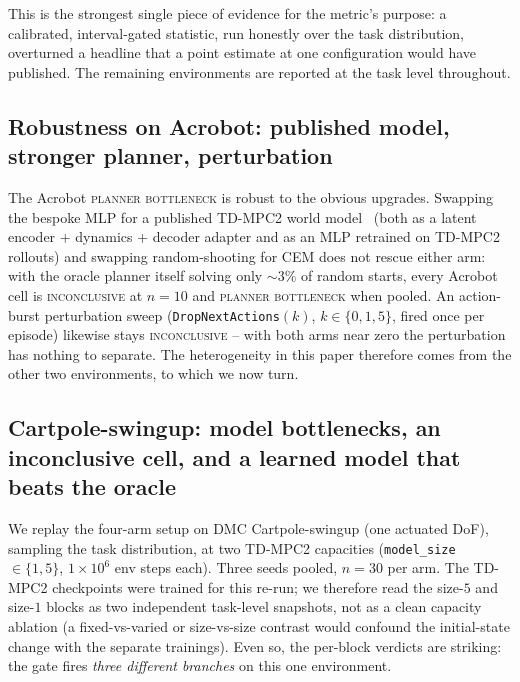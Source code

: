 \documentclass[10pt,letterpaper]{article}
\begin{document}
This is the strongest single piece of evidence for the metric's purpose: a calibrated, interval-gated statistic, run honestly over the task distribution, overturned a headline that a point estimate at one configuration would have published. The remaining environments are reported at the task level throughout.

\subsection{Robustness on Acrobot: published model, stronger planner, perturbation}
\label{sec:robustness}

The Acrobot \textsc{planner bottleneck} is robust to the obvious upgrades. Swapping the bespoke MLP for a published TD-MPC2 world model~\citep{hansen2024tdmpc2} (both as a latent encoder + dynamics + decoder adapter and as an MLP retrained on TD-MPC2 rollouts) and swapping random-shooting for CEM does not rescue either arm: with the oracle planner itself solving only $\sim\!3\%$ of random starts, every Acrobot cell is \textsc{inconclusive} at $n = 10$ and \textsc{planner bottleneck} when pooled. An action-burst perturbation sweep (\texttt{DropNextActions}$(k)$, $k \in \{0, 1, 5\}$, fired once per episode) likewise stays \textsc{inconclusive} -- with both arms near zero the perturbation has nothing to separate. The heterogeneity in this paper therefore comes from the other two environments, to which we now turn.

\subsection{Cartpole-swingup: model bottlenecks, an inconclusive cell, and a learned model that beats the oracle}
\label{sec:crossenv}

We replay the four-arm setup on DMC Cartpole-swingup (one actuated DoF), sampling the task distribution, at two TD-MPC2 capacities (\texttt{model\_size}~$\in \{1, 5\}$, $1 \times 10^{6}$ env steps each). Three seeds pooled, $n = 30$ per arm. The TD-MPC2 checkpoints were trained for this re-run; we therefore read the size-$5$ and size-$1$ blocks as two independent task-level snapshots, not as a clean capacity ablation (a fixed-vs-varied or size-vs-size contrast would confound the initial-state change with the separate trainings). Even so, the per-block verdicts are striking: the gate fires \emph{three different branches} on this one environment.
\end{document}
